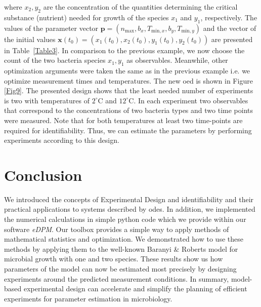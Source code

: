 \documentclass[graybox]{svmult}
\newcommand{\mbx}{\mathbf{x}}
\newcommand{\mbp}{\mathbf{p}}
\begin{document}
where $x_2, y_2$ are the concentration of the quantities determining the critical substance (nutrient) needed for growth of the species $x_1$ and $y_1$, respectively.
The values of the parameter vector $\mbp = (n_\text{max}, b_x, T_{\text{min}, x}, b_y, T_{\text{min}, y})$ and the vector of the initial values $\mbx(t_0)=(x_1(t_0), x_2(t_0), y_1(t_0), y_2(t_0))$ are presented in Table~\ref{Table3}.
%
In comparison to the previous example, we now choose the count of the two bacteria species $x_1,y_1$ as observables.
Meanwhile, other optimization arguments were taken the same as in the previous example i.e. we optimize measurement times and temperatures.
The new \ac{oed} is shown in Figure \ref{Fig9}.
%
%
The presented design shows that the least needed number of experiments is two with temperatures of $2^\circ$C and $12^\circ$C.
In each experiment two observables that correspond to the concentrations of two bacteria types and two time points were measured.
Note that for both temperatures at least two time-points are required for identifiability.
Thus, we can estimate the parameters by performing experiments according to this design.
%
%
%
\section*{Conclusion}
We introduced the concepts of Experimental Design and identifiability and their practical applications to systems described by \acp{ode}.
In addition, we implemented the numerical calculations in simple python code which we provide within our software {\it eDPM}.
Our toolbox provides a simple way to apply methods of mathematical statistics and optimization.
We demonstrated how to use these methods by applying them to the well-known Baranyi \& Roberts model for microbial growth with one and two species.
These results show us how parameters of the model can now be estimated most precisely by designing experiments around the predicted measurement conditions.
In summary, model-based experimental design can accelerate and simplify the planning of efficient experiments for parameter estimation in microbiology.
%
%
%
\end{document}
